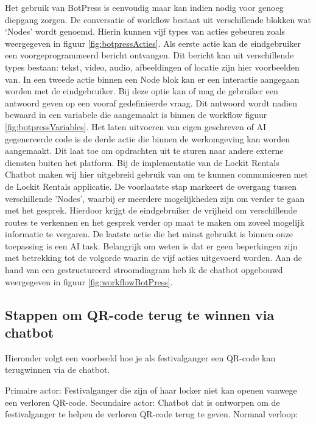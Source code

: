 Het gebruik van BotPress is eenvoudig maar kan indien nodig voor genoeg diepgang zorgen. De conversatie of workflow bestaat uit verschillende blokken wat ‘Nodes’ wordt genoemd. Hierin kunnen vijf types van acties gebeuren zoals weergegeven in figuur \ref{fig:botpressActies}. Als eerste actie kan de eindgebruiker een voorgeprogrammeerd bericht ontvangen. Dit bericht kan uit verschillende types bestaan: tekst, video, audio, afbeeldingen of locatie zijn hier voorbeelden van. In een tweede actie binnen een Node blok kan er een interactie aangegaan worden met de eindgebruiker. Bij deze optie kan of mag de gebruiker een antwoord geven op een vooraf gedefinieerde vraag. Dit antwoord wordt nadien bewaard in een variabele die aangemaakt is binnen de workflow figuur \ref{fig:botpressVariables}. Het laten uitvoeren van eigen geschreven of \ac{AI} gegenereerde code is de derde actie die binnen de werkomgeving kan worden aangemaakt. Dit laat toe om opdrachten uit te sturen naar andere externe diensten buiten het platform. Bij de implementatie van de Lockit Rentals Chatbot maken wij hier uitgebreid gebruik van om te kunnen communiceren met de Lockit Rentals applicatie. De voorlaatste stap markeert de overgang tussen verschillende 'Nodes', waarbij er meerdere mogelijkheden zijn om verder te gaan met het gesprek. Hierdoor krijgt de eindgebruiker de vrijheid om verschillende routes te verkennen en het gesprek verder op maat te maken om zoveel mogelijk informatie te vergaren. De laatste actie die het minst gebruikt is binnen onze toepassing is een \ac{AI} task. 
Belangrijk om weten is dat er geen beperkingen zijn met betrekking tot de volgorde waarin de vijf acties uitgevoerd worden. Aan de hand van een gestructureerd stroomdiagram heb ik de chatbot opgebouwd weergegeven in figuur \ref{fig:workflowBotPress}. 

\subsection{Stappen om QR-code terug te winnen via chatbot}
\label{sec:stappenChatbot}
Hieronder volgt een voorbeeld hoe je als festivalganger een QR-code kan terugwinnen via de chatbot.
\newline

Primaire actor: Festivalganger die zijn of haar locker niet kan openen vanwege een verloren QR-code.
\newline
Secundaire actor: Chatbot dat is ontworpen om de festivalganger te helpen de verloren QR-code terug te geven.
\newline
Normaal verloop:


